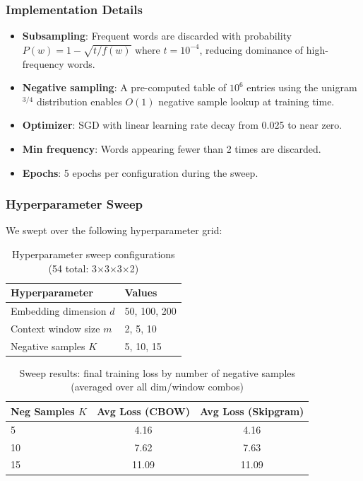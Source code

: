 \documentclass[11pt, a4paper]{article}
\begin{document}
\subsubsection{Implementation Details}

\begin{itemize}[noitemsep]
    \item \textbf{Subsampling}: Frequent words are discarded with probability $P(w) = 1 - \sqrt{t/f(w)}$ where $t = 10^{-4}$, reducing dominance of high-frequency words.
    \item \textbf{Negative sampling}: A pre-computed table of $10^6$ entries using the unigram$^{3/4}$ distribution enables $O(1)$ negative sample lookup at training time.
    \item \textbf{Optimizer}: SGD with linear learning rate decay from 0.025 to near zero.
    \item \textbf{Min frequency}: Words appearing fewer than 2 times are discarded.
    \item \textbf{Epochs}: 5 epochs per configuration during the sweep.
\end{itemize}

\subsubsection{Hyperparameter Sweep}

We swept over the following hyperparameter grid:

\begin{table}[H]
\centering
\caption{Hyperparameter sweep configurations (54 total: 3$\times$3$\times$3$\times$2)}
\begin{tabular}{ll}
\toprule
\textbf{Hyperparameter} & \textbf{Values} \\
\midrule
Embedding dimension $d$ & 50, 100, 200 \\
Context window size $m$ & 2, 5, 10 \\
Negative samples $K$ & 5, 10, 15 \\
\bottomrule
\end{tabular}
\end{table}

\begin{table}[H]
\centering
\caption{Sweep results: final training loss by number of negative samples (averaged over all dim/window combos)}
\begin{tabular}{lcc}
\toprule
\textbf{Neg Samples $K$} & \textbf{Avg Loss (CBOW)} & \textbf{Avg Loss (Skipgram)} \\
\midrule
5  & 4.16 & 4.16 \\
10 & 7.62 & 7.63 \\
15 & 11.09 & 11.09 \\
\bottomrule
\end{tabular}
\end{table}
\end{document}
